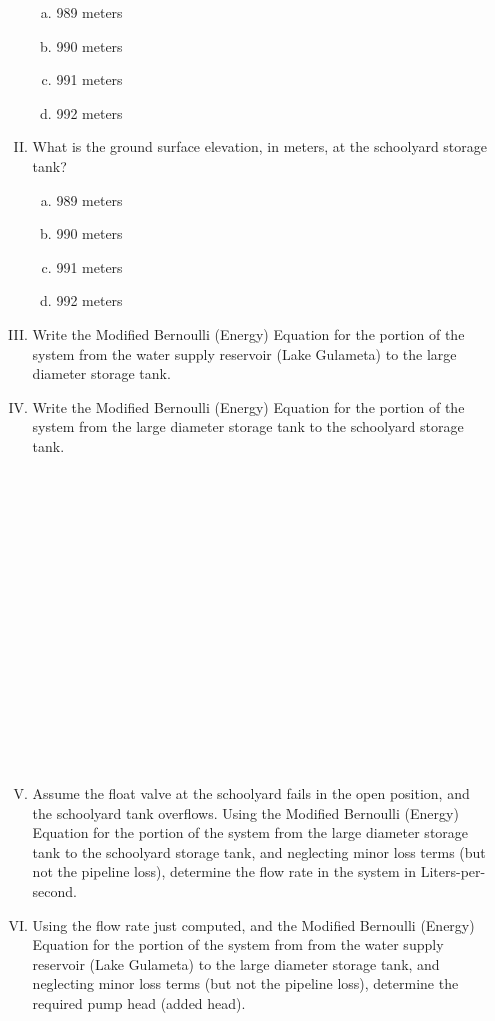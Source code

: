 \documentclass[11pt]{article}
\begin{document}
\begin{enumerate}
\begin{enumerate}[(I)]
\begin{enumerate}[a)]
\item 989 meters
\item 990 meters
\item 991 meters
\item 992 meters
\end{enumerate}
\item What is the ground surface elevation, in meters, at the schoolyard storage tank?
\begin{enumerate}[a)]
\item 989 meters
\item 990 meters
\item 991 meters
\item 992 meters
\end{enumerate}
\item Write the Modified Bernoulli (Energy) Equation for the portion of the system from the water supply reservoir (Lake Gulameta) to the large diameter storage tank. 
\clearpage
\item Write the Modified Bernoulli (Energy) Equation for the portion of the system from the large diameter storage tank to the schoolyard storage tank. \\
~\\~\\~\\~\\~\\~\\~\\~\\~\\~\\~\\~\\~\\~\\~\\~\\
\item Assume the float valve at the schoolyard fails in the open position, and the schoolyard tank overflows.  Using the Modified Bernoulli (Energy) Equation for the portion of the system from the large diameter storage tank to the schoolyard storage tank, and neglecting minor loss terms (but not the pipeline loss), determine the flow rate in the system in Liters-per-second.
\clearpage
\item Using the flow rate just computed, and the Modified Bernoulli (Energy) Equation for the portion of the system from from the water supply reservoir (Lake Gulameta) to the large diameter storage tank, and neglecting minor loss terms (but not the pipeline loss), determine the required pump head (added head).

\end{enumerate}
\end{enumerate}
\end{document}
